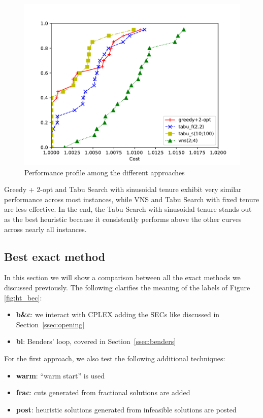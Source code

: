 \documentclass{article}
\begin{document}
\begin{figure}[ht]
        \caption{Performance profile among the different approaches}
        \label{fig:res_bestheu}
        \centering
        \includegraphics[width=340pt]{assets/res_bestheu.pdf}
\end{figure}

Greedy + 2-opt and Tabu Search with sinusoidal tenure exhibit very similar performance
across most instances, while VNS and Tabu Search with fixed tenure are less effective.
In the end, the Tabu Search with sinusoidal tenure stands out as the best heuristic
because it consistently performs above the other curves across nearly all
instances.

\clearpage
\newpage

\subsection{Best exact method}
In this section we will show a comparison between all the exact methods
we discussed previously.
The following clarifies the meaning of the labels of Figure \ref{fig:ht_bec}:
\begin{itemize}
        \item \textbf{b\&c}: we interact with CPLEX adding the SECs like discussed in Section~\ref{ssec:opening}
        \item \textbf{bl}: Benders' loop, covered in Section~\ref{ssec:benders}
\end{itemize}
For the first approach, we also test the following additional techniques:
\begin{itemize}
        \item \textbf{warm}: ``warm start'' is used
        \item \textbf{frac}: cuts generated from fractional solutions are added
        \item \textbf{post}: heuristic solutions generated from infeasible solutions
                are posted
\end{itemize}
\end{document}
